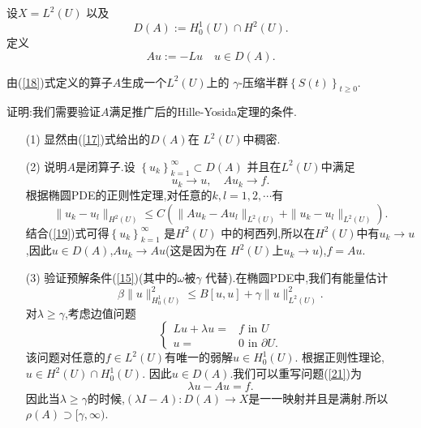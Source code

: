  设$X=L^2(U)$ 以及
  \begin{equation}
    D(A):= H_0^{1}(U)\cap H^2(U).\label{17}
  \end{equation}
  定义
\begin{equation}
  Au:=-Lu \quad u \in D(A).\label{18}
\end{equation}

  \begin{theorem}
    由{\normalfont(\ref{18})}式定义的算子$A$生成一个$L^2(U)$上的 $\gamma$-压缩半群$\left\{S(t)\right\} _{t\ge 0}$.
  \end{theorem}
  证明:我们需要验证$A$满足推广后的Hille-Yosida定理的条件.
  \begin{enumerate}
    \item [(1)] 显然由(\ref{17})式给出的$D(A)$在 $L^2(U)$中稠密.
    \item [(2)] 说明$A$是闭算子.设 $\left\{u_k\right\} _{k=1}^{\infty}\subset  D(A)$ 并且在$L^2(U)$中满足
      \begin{equation}
	u_k\to u,\quad Au_k\to f.\label{19} 
      \end{equation}
      根据椭圆PDE的正则性定理,对任意的$k,l=1,2,\cdots$有
      \[
	\|u_k-u_l\|_{H^2(U)}\le C \left( \|Au_k-Au_l\|_{L^2(U)}+\|u_k-u_l\|_{L^2(U)} \right) 
      .\] 结合(\ref{19})式可得$\left\{u_k\right\} _{k=1}^{\infty}$ 是$H^2(U)$ 中的柯西列,所以在$H^2(U)$中有$u_k\to u$,因此$u\in D(A)$,$Au_k\to Au$(这是因为在 $H^2(U)$上$u_k\to u$),$f=Au$.
    \item [(3)] 验证预解条件(\ref{15})(其中的$\omega$被$\gamma$ 代替).在椭圆PDE中,我们有能量估计
      \begin{equation}
	\beta \|u\|^2_{H_0^{1}(U)}\le B[u,u] +\gamma \|u\|^2_{L^2(U)}.\label{20}
      \end{equation}
      对$\lambda\ge \gamma$,考虑边值问题
      \begin{equation}\label{21}
        \left\{
	  \begin{aligned}
	    Lu+\lambda u= & f \text{ in }U\\
	    u=&0 \text{ in }\partial U.
	  \end{aligned}
	  \right.
      \end{equation}
      该问题对任意的$f\in L^2(U)$有唯一的弱解$u\in H_0^{1}(U)$. 根据正则性理论,$u \in H^2(U)\cap  H_0^{1}(U)$. 因此$u\in D(A)$.我们可以重写问题(\ref{21})为
      \begin{equation}
        \lambda u -A u=f.
      \end{equation}
      因此当$\lambda\ge \gamma$的时候,$(\lambda I-A):D(A)\to X$是一一映射并且是满射.所以$\rho(A)\supset[\gamma,\infty)$.

\end{enumerate}
